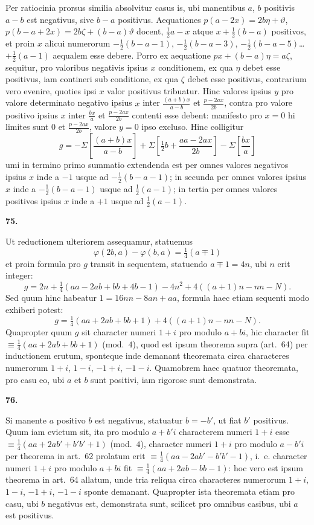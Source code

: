 \documentclass[12pt,a4paper]{article}
\newcommand{\art}[1]{\begin{center}\textbf{#1.}\end{center}}
\begin{document}
Per ratiocinia prorsus similia absolvitur casus is, ubi manentibus $a$, $b$ positivis $a-b$ est negativus, sive $b-a$ positivus. Aequationes $p(a-2x)=2b\eta+\vartheta$, $p(b-a+2x)=2b\zeta+(b-a)\vartheta$ docent, $\frac{1}{2}a-x$ atque $x+\frac{1}{2}(b-a)$ positivos, et proin $x$ alicui numerorum $-\frac{1}{2}(b-a-1)$, $-\frac{1}{2}(b-a-3)$, $-\frac{1}{2}(b-a-5)$\ldots$+\frac{1}{2}(a-1)$ aequalem esse debere. Porro ex aequatione $px+(b-a)\eta=a\zeta$, sequitur, pro valoribus negativis ipsius $x$ conditionem, ex qua $\eta$ debet esse positivus, iam contineri sub conditione, ex qua $\zeta$ debet esse positivus, contrarium vero evenire, quoties ipsi $x$ valor positivus tribuatur. Hinc valores ipsius $y$ pro valore determinato negativo ipsius $x$ inter $\frac{(a+b)x}{a-b}$ et $\frac{p-2ax}{2b}$, contra pro valore positivo ipsius $x$ inter $\frac{bx}{a}$ et $\frac{p-2ax}{2b}$ contenti esse debent: manifesto pro $x=0$ hi limites sunt $0$ et $\frac{p-2ax}{2b}$, valore $y=0$ ipso excluso. Hinc colligitur
\[g = -\Sigma\left[\frac{(a+b)x}{a-b}\right] + \Sigma\left[\tfrac{1}{2}b + \frac{aa-2ax}{2b}\right] - \Sigma\left[\frac{bx}{a}\right]\]
umi in termino primo summatio extendenda est per omnes valores negativos ipsius $x$ inde a $-1$ usque ad $-\frac{1}{2}(b-a-1)$; in secunda per omnes valores ipsius $x$ inde a $-\frac{1}{2}(b-a-1)$ usque ad $\frac{1}{2}(a-1)$; in tertia per omnes valores positivos ipsius $x$ inde a $+1$ usque ad $\frac{1}{2}(a-1)$.

\art{75}

Ut reductionem ulteriorem assequamur, statuemus
\[\varphi(2b,a) - \varphi(b,a) = \tfrac{1}{4}(a\mp 1)\]
et proin formula pro $g$ transit in sequentem, statuendo $a\mp 1=4n$, ubi $n$ erit integer:
\[g = 2n + \tfrac{1}{4}(aa-2ab+bb+4b-1) - 4n^2 + 4((a+1)n - nn - N).\]
Sed quum hinc habeatur $1=16nn-8an+aa$, formula haec etiam sequenti modo exhiberi potest:
\[g = \tfrac{1}{4}(aa+2ab+bb+1) + 4((a+1)n - nn - N).\]
Quapropter quum $g$ sit character numeri $1+i$ pro modulo $a+bi$, hic character fit $\equiv\frac{1}{4}(aa+2ab+bb+1)$ (mod.~$4$), quod est ipsum theorema supra (art.~64) per inductionem erutum, sponteque inde demanant theoremata circa characteres numerorum $1+i$, $1-i$, $-1+i$, $-1-i$. Quamobrem haec quatuor theoremata, pro casu eo, ubi $a$ et $b$ sunt positivi, iam rigorose sunt demonstrata.

\art{76}

Si manente $a$ positivo $b$ est negativus, statuatur $b=-b'$, ut fiat $b'$ positivus. Quum iam evictum sit, ita pro modulo $a+b'i$ characterem numeri $1+i$ esse $\equiv\frac{1}{4}(aa+2ab'+b'b'+1)$ (mod.~$4$), character numeri $1+i$ pro modulo $a-b'i$ per theorema in art.~62 prolatum erit $\equiv\frac{1}{4}(aa-2ab'-b'b'-1)$, i.~e. character numeri $1+i$ pro modulo $a+bi$ fit $\equiv\frac{1}{4}(aa+2ab-bb-1)$: hoc vero est ipsum theorema in art.~64 allatum, unde tria reliqua circa characteres numerorum $1+i$, $1-i$, $-1+i$, $-1-i$ sponte demanant. Quapropter ista theoremata etiam pro casu, ubi $b$ negativus est, demonstrata sunt, scilicet pro omnibus casibus, ubi $a$ est positivus.
\end{document}
